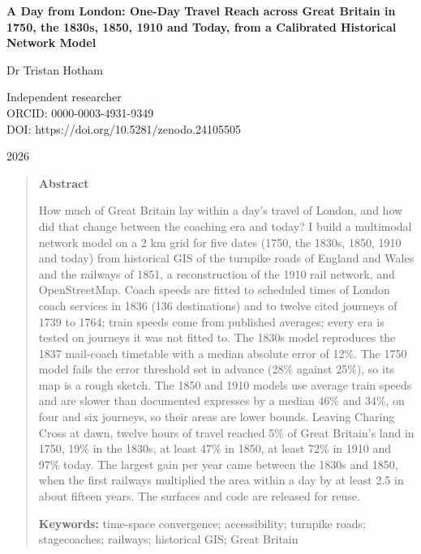 \documentclass[11pt,a4paper]{article}
\begin{document}
\begin{center}
{\Large\bfseries A Day from London: One-Day Travel Reach across Great Britain in 1750, the 1830s, 1850, 1910 and Today, from a Calibrated Historical Network Model\par}
\vspace{1.2em}
{\large Dr Tristan Hotham\par}
\vspace{0.3em}
{\small Independent researcher\\
ORCID: 0000-0003-4931-9349\\
DOI: https://doi.org/10.5281/zenodo.24105505\par}
\vspace{0.8em}
2026
\end{center}

\begin{quote}
\small
\begin{center}\textbf{Abstract}\end{center}
How much of Great Britain lay within a day's travel of London, and how did that change between the coaching era and today? I build a multimodal network model on a 2 km grid for five dates (1750, the 1830s, 1850, 1910 and today) from historical GIS of the turnpike roads of England and Wales and the railways of 1851, a reconstruction of the 1910 rail network, and OpenStreetMap. Coach speeds are fitted to scheduled times of London coach services in 1836 (136 destinations) and to twelve cited journeys of 1739 to 1764; train speeds come from published averages; every era is tested on journeys it was not fitted to. The 1830s model reproduces the 1837 mail-coach timetable with a median absolute error of 12\%. The 1750 model fails the error threshold set in advance (28\% against 25\%), so its map is a rough sketch. The 1850 and 1910 models use average train speeds and are slower than documented expresses by a median 46\% and 34\%, on four and six journeys, so their areas are lower bounds. Leaving Charing Cross at dawn, twelve hours of travel reached 5\% of Great Britain's land in 1750, 19\% in the 1830s, at least 47\% in 1850, at least 72\% in 1910 and 97\% today. The largest gain per year came between the 1830s and 1850, when the first railways multiplied the area within a day by at least 2.5 in about fifteen years. The surfaces and code are released for reuse.

\textbf{Keywords:} time-space convergence; accessibility; turnpike roads; stagecoaches; railways; historical GIS; Great Britain
\end{quote}
\end{document}
